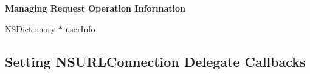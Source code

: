 \begin{Indent}\textbf{ Managing Request Operation Information}\par
{\em 

 

 }\begin{DoxyCompactItemize}
\item 
N\+S\+Dictionary $\ast$ \mbox{\hyperlink{interface_a_f_u_r_l_connection_operation_a118c5029a66496f6c9093a4e06d30faf}{user\+Info}}
\end{DoxyCompactItemize}
\end{Indent}
\subsection*{Setting N\+S\+U\+R\+L\+Connection Delegate Callbacks}
\label{_amgrp784111e69b3f1d523411e11cf76aebe4}%


 

